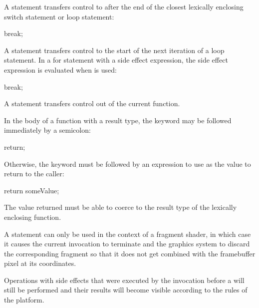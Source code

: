 

A  statement transfers control to after the end of the closest lexically enclosing switch statement or loop statement:

\begin{codeblock}
break;
\end{codeblock}


A  statement transfers control to the start of the next iteration of a loop statement.
In a for statement with a side effect expression, the side effect expression is evaluated when  is used:

\begin{codeblock}
break; 
\end{codeblock}


A  statement transfers control out of the current function.

In the body of a function with a  result type, the  keyword may be followed immediately by a semicolon:

\begin{codeblock}
return;
\end{codeblock}

Otherwise, the  keyword must be followed by an expression to use as the value to return to the caller:

\begin{codeblock}
return someValue;
\end{codeblock}

The value returned must be able to coerce to the result type of the lexically enclosing function.


A  statement can only be used in the context of a fragment shader, in which case it causes the current invocation to terminate and the graphics system to discard the corresponding fragment so that it does not get combined with the framebuffer pixel at its coordinates.

Operations with side effects that were executed by the invocation before a  will still be performed and their results will become visible according to the rules of the platform.


